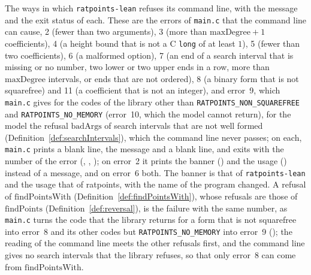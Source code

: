 \begin{definition}\label{def:cliFailure}
  \leanok
  The ways in which \verb|ratpoints-lean| refuses its command line, with the message and the exit
  status of each. These are the errors of \verb|main.c| that the command line can cause, 2 (fewer
  than two arguments), 3 (more than $\mathrm{maxDegree} + 1$ coefficients), 4 (a height bound that
  is not a C \verb|long| of at least $1$), 5 (fewer than two coefficients), 6 (a malformed option),
  7 (an end of a search interval that is missing or no number, two lower or two upper ends in a row,
  more than $\mathrm{maxDegree}$ intervals, or ends that are not ordered), 8 (a binary form that is
  not squarefree) and 11 (a coefficient that is not an integer), and error~9, which \verb|main.c|
  gives for the codes of the library other than \verb|RATPOINTS_NON_SQUAREFREE| and
  \verb|RATPOINTS_NO_MEMORY| (error~10, which the model cannot return), for the model the refusal
  $\mathrm{badArgs}$ of search intervals that are not well formed
  (Definition~\ref{def:searchIntervals}), which the command line never passes; on each,
  \verb|main.c| prints a blank line, the message and a blank line, and exits with the number of the
  error (, , );
  on error~2 it prints the banner () and the usage
  () instead of a message, and on error~6 both. The banner is that of
  \verb|ratpoints-lean| and the usage that of ratpoints, with the name of the program changed. A
  refusal of $\mathrm{findPointsWith}$ (Definition~\ref{def:findPointsWith}), whose refusals are
  those of $\mathrm{findPoints}$ (Definition~\ref{def:reversal}), is the failure with the same
  number, as \verb|main.c| turns the code that the library returns for a form that is not squarefree
  into error~8 and its other codes but \verb|RATPOINTS_NO_MEMORY| into error~9
  (); the reading of the command line meets the other refusals first, and
  the command line gives no search intervals that the library refuses, so that only error~8 can come
  from $\mathrm{findPointsWith}$.
\end{definition}

